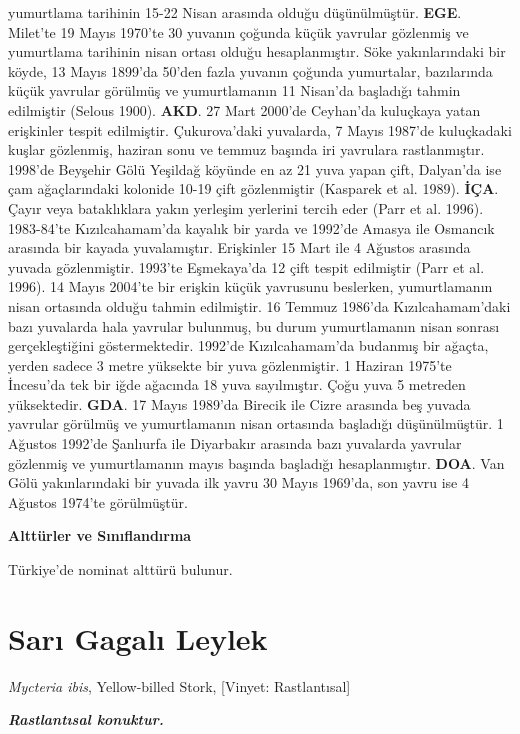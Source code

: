 \documentclass[
  letterpaper,
  DIV=11,
  numbers=noendperiod]{scrreprt}
\begin{document}
yumurtlama tarihinin 15-22 Nisan arasında olduğu düşünülmüştür.
\textbf{EGE}. Milet'te 19 Mayıs 1970'te 30 yuvanın çoğunda küçük
yavrular gözlenmiş ve yumurtlama tarihinin nisan ortası olduğu
hesaplanmıştır. Söke yakınlarındaki bir köyde, 13 Mayıs 1899'da 50'den
fazla yuvanın çoğunda yumurtalar, bazılarında küçük yavrular görülmüş ve
yumurtlamanın 11 Nisan'da başladığı tahmin edilmiştir (Selous 1900).
\textbf{AKD}. 27 Mart 2000'de Ceyhan'da kuluçkaya yatan erişkinler
tespit edilmiştir. Çukurova'daki yuvalarda, 7 Mayıs 1987'de kuluçkadaki
kuşlar gözlenmiş, haziran sonu ve temmuz başında iri yavrulara
rastlanmıştır. 1998'de Beyşehir Gölü Yeşildağ köyünde en az 21 yuva
yapan çift, Dalyan'da ise çam ağaçlarındaki kolonide 10-19 çift
gözlenmiştir (Kasparek et al. 1989). \textbf{İÇA}. Çayır veya
bataklıklara yakın yerleşim yerlerini tercih eder (Parr et al. 1996).
1983-84'te Kızılcahamam'da kayalık bir yarda ve 1992'de Amasya ile
Osmancık arasında bir kayada yuvalamıştır. Erişkinler 15 Mart ile 4
Ağustos arasında yuvada gözlenmiştir. 1993'te Eşmekaya'da 12 çift tespit
edilmiştir (Parr et al. 1996). 14 Mayıs 2004'te bir erişkin küçük
yavrusunu beslerken, yumurtlamanın nisan ortasında olduğu tahmin
edilmiştir. 16 Temmuz 1986'da Kızılcahamam'daki bazı yuvalarda hala
yavrular bulunmuş, bu durum yumurtlamanın nisan sonrası gerçekleştiğini
göstermektedir. 1992'de Kızılcahamam'da budanmış bir ağaçta, yerden
sadece 3 metre yüksekte bir yuva gözlenmiştir. 1 Haziran 1975'te
İncesu'da tek bir iğde ağacında 18 yuva sayılmıştır. Çoğu yuva 5
metreden yüksektedir. \textbf{GDA}. 17 Mayıs 1989'da Birecik ile Cizre
arasında beş yuvada yavrular görülmüş ve yumurtlamanın nisan ortasında
başladığı düşünülmüştür. 1 Ağustos 1992'de Şanlıurfa ile Diyarbakır
arasında bazı yuvalarda yavrular gözlenmiş ve yumurtlamanın mayıs
başında başladığı hesaplanmıştır. \textbf{DOA}. Van Gölü yakınlarındaki
bir yuvada ilk yavru 30 Mayıs 1969'da, son yavru ise 4 Ağustos 1974'te
görülmüştür.

\textbf{Alttürler ve Sınıflandırma}

Türkiye'de nominat alttürü bulunur.

\section{Sarı Gagalı Leylek}\label{sarux131-gagalux131-leylek}

\emph{Mycteria ibis}, Yellow-billed Stork, {[}Vinyet: Rastlantısal{]}

\textbf{\emph{Rastlantısal konuktur.}}
\end{document}
